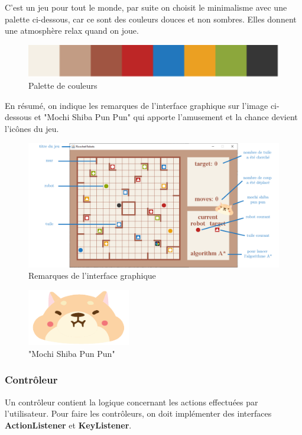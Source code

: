 \documentclass[12pt, pdflatex]{article}
\begin{document}
        C'est un jeu pour tout le monde, par suite on choisit le minimalisme avec
        une palette ci-dessous, car ce sont des couleurs douces et non sombres. Elles donnent une atmosphère relax quand on joue.
        \begin{figure}[H]
            \centering
            \includegraphics[width=1\textwidth]{sources/palette.pdf}
            \caption{Palette de couleurs}
        \end{figure}

        En résumé, on indique les remarques de l'interface graphique sur l'image ci-dessous et "Mochi Shiba Pun Pun" qui apporte l'amusement et la chance devient l'icônes du jeu.
        \begin{figure}[H]
            \centering
            \includegraphics[width=1\textwidth]{sources/note.pdf}
            \caption{Remarques de l'interface graphique}
        \end{figure}

        \begin{figure}[H]
            \centering
            \includegraphics[width=0.4\textwidth]{sources/chomap.pdf}
            \caption{"Mochi Shiba Pun Pun"}
        \end{figure}

        \subsubsection{Contrôleur}
        Un contrôleur contient la logique concernant les actions effectuées par l'utilisateur. Pour faire les contrôleurs, on doit implémenter des interfaces \textbf{ActionListener} et \textbf{KeyListener}.
\end{document}
